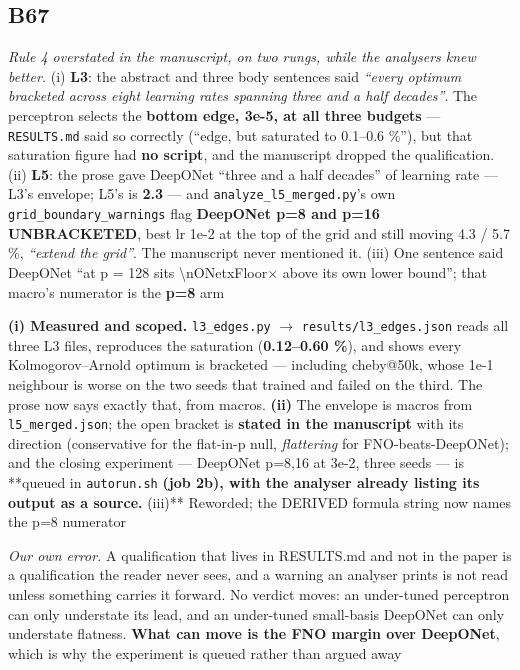\documentclass[10pt]{article}
\begin{document}
\subsection*{B67}\label{led:B67}
\begin{description}[leftmargin=0pt,itemsep=1pt]
\item[Defect.] \emph{Rule 4 overstated in the manuscript, on two rungs, while the analysers knew better.} (i) \textbf{L3}: the abstract and three body sentences said \emph{``every optimum bracketed across eight learning rates spanning three and a half decades''}. The perceptron selects the \textbf{bottom edge, 3e-5, at all three budgets} --- \texttt{RESULTS.md} said so correctly (``edge, but saturated to 0.1--0.6 \%''), but that saturation figure had \textbf{no script}, and the manuscript dropped the qualification. (ii) \textbf{L5}: the prose gave DeepONet ``three and a half decades'' of learning rate --- L3's envelope; L5's is \textbf{2.3} --- and \texttt{analyze\_l5\_merged.py}'s own \texttt{grid\_boundary\_warnings} flag \textbf{DeepONet p=8 and p=16 UNBRACKETED}, best lr 1e-2 at the top of the grid and still moving 4.3 / 5.7 \%, \emph{``extend the grid''}. The manuscript never mentioned it. (iii) One sentence said DeepONet ``at p = 128 sits \textbackslash{}nONetxFloor$\times$ above its own lower bound''; that macro's numerator is the \textbf{p=8} arm
\item[Resolution.] \textbf{(i) Measured and scoped.} \texttt{l3\_edges.py} $\rightarrow$ \texttt{results/l3\_edges.json} reads all three L3 files, reproduces the saturation (\textbf{0.12--0.60 \%}), and shows every Kolmogorov--Arnold optimum is bracketed --- including cheby@50k, whose 1e-1 neighbour is worse on the two seeds that trained and failed on the third. The prose now says exactly that, from macros. \textbf{(ii)} The envelope is macros from \texttt{l5\_merged.json}; the open bracket is \textbf{stated in the manuscript} with its direction (conservative for the flat-in-p null, \emph{flattering} for FNO-beats-DeepONet); and the closing experiment --- DeepONet p=8,16 at 3e-2, three seeds --- is **queued in \texttt{autorun.sh}\textbf{ (job 2b), with the analyser already listing its output as a source. }(iii)** Reworded; the DERIVED formula string now names the p=8 numerator
\item[Note.] \emph{Our own error.} A qualification that lives in RESULTS.md and not in the paper is a qualification the reader never sees, and a warning an analyser prints is not read unless something carries it forward. No verdict moves: an under-tuned perceptron can only understate its lead, and an under-tuned small-basis DeepONet can only understate flatness. \textbf{What can move is the FNO margin over DeepONet}, which is why the experiment is queued rather than argued away
\end{description}
\end{document}

